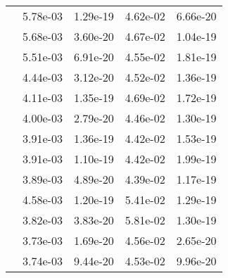 \begin{table}
\begin{tabular}{c|cc|cc|}
\multicolumn{1}{|c|}{} & \multicolumn{1}{|c|}{  5.78e-03} & \multicolumn{1}{|c|}{  1.29e-19} & \multicolumn{1}{|c|}{  4.62e-02} & \multicolumn{1}{|c|}{  6.66e-20} \\ 
\multicolumn{1}{|c|}{} & \multicolumn{1}{|c|}{  5.68e-03} & \multicolumn{1}{|c|}{  3.60e-20} & \multicolumn{1}{|c|}{  4.67e-02} & \multicolumn{1}{|c|}{  1.04e-19} \\ 
\multicolumn{1}{|c|}{} & \multicolumn{1}{|c|}{  5.51e-03} & \multicolumn{1}{|c|}{  6.91e-20} & \multicolumn{1}{|c|}{  4.55e-02} & \multicolumn{1}{|c|}{  1.81e-19} \\ 
\multicolumn{1}{|c|}{} & \multicolumn{1}{|c|}{  4.44e-03} & \multicolumn{1}{|c|}{  3.12e-20} & \multicolumn{1}{|c|}{  4.52e-02} & \multicolumn{1}{|c|}{  1.36e-19} \\ 
\multicolumn{1}{|c|}{} & \multicolumn{1}{|c|}{  4.11e-03} & \multicolumn{1}{|c|}{  1.35e-19} & \multicolumn{1}{|c|}{  4.69e-02} & \multicolumn{1}{|c|}{  1.72e-19} \\ 
\multicolumn{1}{|c|}{} & \multicolumn{1}{|c|}{  4.00e-03} & \multicolumn{1}{|c|}{  2.79e-20} & \multicolumn{1}{|c|}{  4.46e-02} & \multicolumn{1}{|c|}{  1.30e-19} \\ 
\multicolumn{1}{|c|}{} & \multicolumn{1}{|c|}{  3.91e-03} & \multicolumn{1}{|c|}{  1.36e-19} & \multicolumn{1}{|c|}{  4.42e-02} & \multicolumn{1}{|c|}{  1.53e-19} \\ 
\multicolumn{1}{|c|}{} & \multicolumn{1}{|c|}{  3.91e-03} & \multicolumn{1}{|c|}{  1.10e-19} & \multicolumn{1}{|c|}{  4.42e-02} & \multicolumn{1}{|c|}{  1.99e-19} \\ 
\multicolumn{1}{|c|}{} & \multicolumn{1}{|c|}{  3.89e-03} & \multicolumn{1}{|c|}{  4.89e-20} & \multicolumn{1}{|c|}{  4.39e-02} & \multicolumn{1}{|c|}{  1.17e-19} \\ 
\multicolumn{1}{|c|}{} & \multicolumn{1}{|c|}{  4.58e-03} & \multicolumn{1}{|c|}{  1.20e-19} & \multicolumn{1}{|c|}{  5.41e-02} & \multicolumn{1}{|c|}{  1.29e-19} \\ 
\multicolumn{1}{|c|}{} & \multicolumn{1}{|c|}{  3.82e-03} & \multicolumn{1}{|c|}{  3.83e-20} & \multicolumn{1}{|c|}{  5.81e-02} & \multicolumn{1}{|c|}{  1.30e-19} \\ 
\multicolumn{1}{|c|}{} & \multicolumn{1}{|c|}{  3.73e-03} & \multicolumn{1}{|c|}{  1.69e-20} & \multicolumn{1}{|c|}{  4.56e-02} & \multicolumn{1}{|c|}{  2.65e-20} \\ 
\multicolumn{1}{|c|}{} & \multicolumn{1}{|c|}{  3.74e-03} & \multicolumn{1}{|c|}{  9.44e-20} & \multicolumn{1}{|c|}{  4.53e-02} & \multicolumn{1}{|c|}{  9.96e-20} \\ 

\end{tabular}
\end{table}
